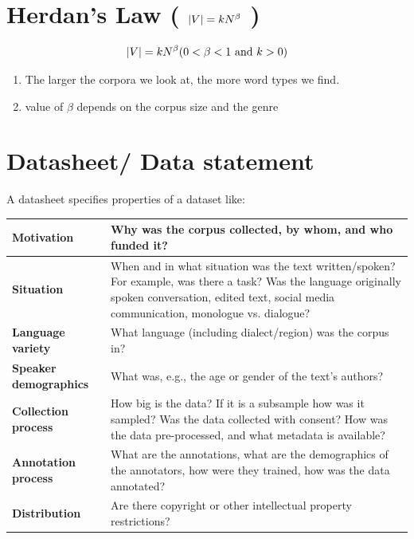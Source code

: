 \section{Herdan’s Law ( $\left| V \right| = kN^{\beta}$ ) \cite{nlp-1}} \label{Herdan’s Law}

\[
    \dabs{V} = kN^{\beta} \hfill (0 < \beta < 1 \text{ and } k > 0)
\]

\begin{enumerate}
    \item The larger the corpora we look at, the more word types we find.
    \item value of $\beta$ depends on the corpus size and the genre
\end{enumerate}

\section{Datasheet/ Data statement}\label{Datasheet/ Data statement}

A datasheet specifies properties of a dataset like:
\begin{table}[h]
    \centering
    \begin{tabular}{|m{3.5cm}|m{11.5cm}|}
        \hline
        
        \textbf{Motivation} & Why was the corpus collected, by whom, and who funded it?  \\ 
        \hline
         
         \textbf{Situation} & When and in what situation was the text written/spoken? For example, was there a task? Was the language originally spoken conversation, edited text, social media communication, monologue vs. dialogue? \\
         \hline
         
        \textbf{Language variety} & What language (including dialect/region) was the corpus in? \\
        \hline
        
        \textbf{Speaker demographics} & What was, e.g., the age or gender of the text’s authors? \\
        \hline
        
        \textbf{Collection process} & How big is the data? If it is a subsample how was it sampled? Was the data collected with consent? How was the data pre-processed, and what metadata is available? \\
        \hline

        \textbf{Annotation process} & What are the annotations, what are the demographics of the annotators, how were they trained, how was the data annotated? \\ 
        \hline

        \textbf{Distribution} & Are there copyright or other intellectual property restrictions?\\
        \hline
        
    \end{tabular}
\end{table}


